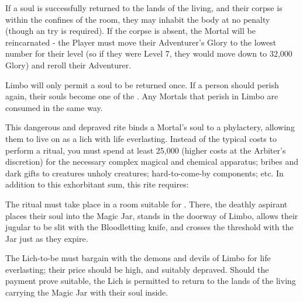 If a soul is successfully returned to the lands of the living, and their corpse is within the confines of the room, they may inhabit the body at no penalty (though an \INSANITY try is required).  If the corpse is absent, the Mortal will be reincarnated - the Player must move their Adventurer's Glory to the lowest number for their level (so if they were Level 7, they would move down to 32,000 Glory) and reroll their Adventurer.

Limbo will only permit a soul to be returned once. If a person should perish again, their souls become one of the . Any Mortals that perish in Limbo are consumed in the same way.


\OCCULT[
  Name=Lichdom,
  Link=occultism-lichdom,
  Pips=20,
  Time=Months
]

This dangerous and depraved rite binds a Mortal's soul to a phylactery, allowing them to live on as a lich with life everlasting. Instead of the typical costs to perform a ritual, you must spend at least 25,000 \AU (higher costs at the Arbiter's discretion) for the necessary complex magical and chemical apparatus; bribes and dark gifts to creatures unholy creatures; hard-to-come-by components; etc. In addition to this exhorbitant sum, this rite requires:


The ritual must take place in a room suitable for . There, the deathly aspirant places their soul into the Magic Jar, stands in the doorway of Limbo, allows their jugular to be slit with the Bloodletting knife, and crosses the threshold with the Jar just as they expire.

\newpage


\cbreak

The Lich-to-be must bargain with the demons and devils of Limbo for life everlasting; their price should be high, and suitably depraved. Should the payment prove suitable, the Lich is permitted to return to the lands of the living carrying the Magic Jar with their soul inside.

